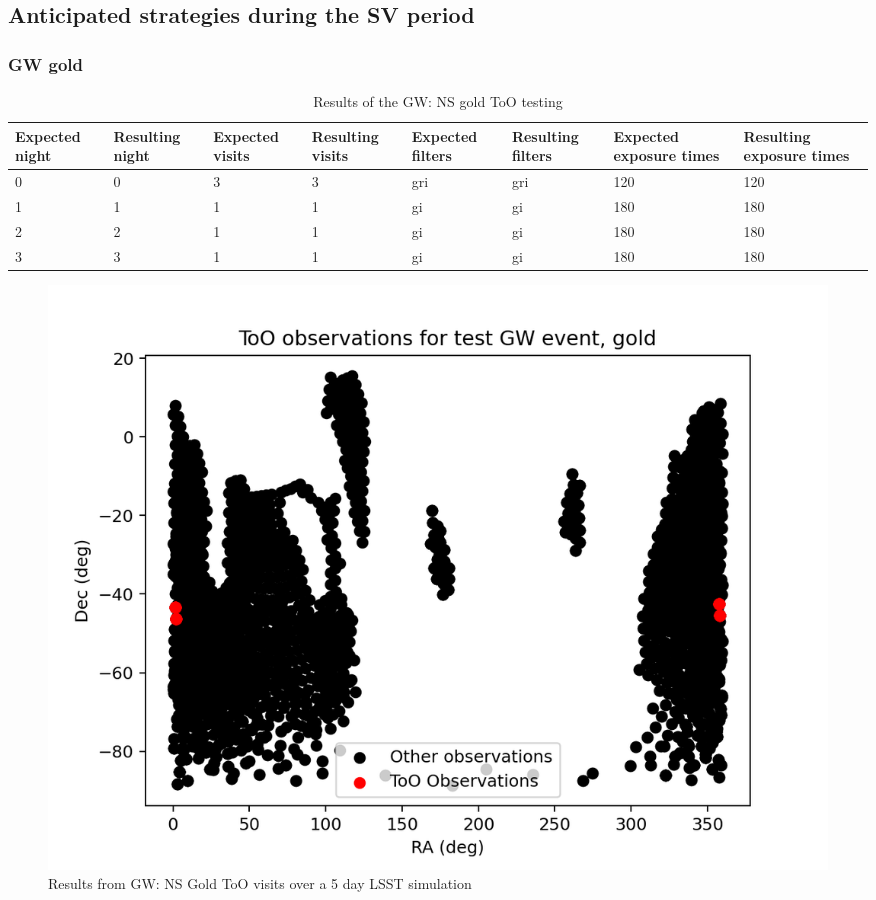\subsection{Anticipated strategies during the SV period}

\subsubsection{GW gold}


\begin{table}[h!]
\centering
\begin{adjustbox}{max width=\textwidth}
\begin{tabular}{|l|l|l|l|l|l|l|l|}
\hline
Expected night & Resulting night & Expected visits & Resulting visits & Expected filters & Resulting filters & Expected exposure times & Resulting exposure times \\ \hline
0              & 0               & 3               & 3                & gri              & gri               & 120                     & 120                      \\ \hline
1              & 1               & 1               & 1                & gi               & gi                & 180                     & 180                      \\ \hline
2              & 2               & 1               & 1                & gi               & gi                & 180                     & 180                      \\ \hline
3              & 3               & 1               & 1                & gi               & gi                & 180                     & 180                      \\ \hline
\end{tabular}
\end{adjustbox}
\caption{Results of the GW: NS gold ToO testing}
\label{tab:GWGoldResults}
\end{table}

\begin{figure}
    \centering
    \includegraphics[width=0.7\linewidth]{figures/validationTests/SVRequired/GWGoldPosition.png}
    \caption{Results from GW: NS Gold ToO visits over a 5 day LSST simulation}
    \label{fig:GWGoldPositionResult}
\end{figure}

